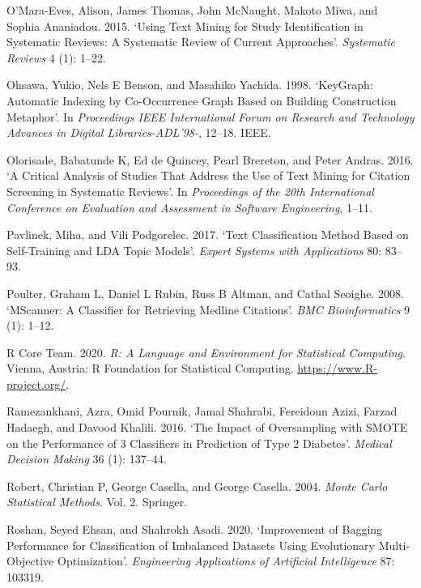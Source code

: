 \documentclass{article}
\newlength{\cslhangindent}
\newenvironment{CSLReferences}[2] %
 {%
  \setlength{\parindent}{0pt}
  \ifodd #1 \everypar{\setlength{\hangindent}{\cslhangindent}}\ignorespaces\fi
  \ifnum #2 > 0
  \setlength{\parskip}{#2\baselineskip}
  \fi
 }%
 {}
\begin{document}
\begin{CSLReferences}{1}{0}
\leavevmode{}%
O'Mara-Eves, Alison, James Thomas, John McNaught, Makoto Miwa, and
Sophia Ananiadou. 2015. {`Using Text Mining for Study Identification in
Systematic Reviews: A Systematic Review of Current Approaches'}.
\emph{Systematic Reviews} 4 (1): 1--22.

\leavevmode{}%
Ohsawa, Yukio, Nels E Benson, and Masahiko Yachida. 1998. {`KeyGraph:
Automatic Indexing by Co-Occurrence Graph Based on Building Construction
Metaphor'}. In \emph{Proceedings IEEE International Forum on Research
and Technology Advances in Digital Libraries-ADL'98-}, 12--18. IEEE.

\leavevmode{}%
Olorisade, Babatunde K, Ed de Quincey, Pearl Brereton, and Peter Andras.
2016. {`A Critical Analysis of Studies That Address the Use of Text
Mining for Citation Screening in Systematic Reviews'}. In
\emph{Proceedings of the 20th International Conference on Evaluation and
Assessment in Software Engineering}, 1--11.

\leavevmode{}%
Pavlinek, Miha, and Vili Podgorelec. 2017. {`Text Classification Method
Based on Self-Training and LDA Topic Models'}. \emph{Expert Systems with
Applications} 80: 83--93.

\leavevmode{}%
Poulter, Graham L, Daniel L Rubin, Russ B Altman, and Cathal Seoighe.
2008. {`MScanner: A Classifier for Retrieving Medline Citations'}.
\emph{BMC Bioinformatics} 9 (1): 1--12.

\leavevmode{}%
R Core Team. 2020. \emph{R: A Language and Environment for Statistical
Computing}. Vienna, Austria: R Foundation for Statistical Computing.
\url{https://www.R-project.org/}.

\leavevmode{}%
Ramezankhani, Azra, Omid Pournik, Jamal Shahrabi, Fereidoun Azizi,
Farzad Hadaegh, and Davood Khalili. 2016. {`The Impact of Oversampling
with SMOTE on the Performance of 3 Classifiers in Prediction of Type 2
Diabetes'}. \emph{Medical Decision Making} 36 (1): 137--44.

\leavevmode{}%
Robert, Christian P, George Casella, and George Casella. 2004.
\emph{Monte Carlo Statistical Methods}. Vol. 2. Springer.

\leavevmode{}%
Roshan, Seyed Ehsan, and Shahrokh Asadi. 2020. {`Improvement of Bagging
Performance for Classification of Imbalanced Datasets Using Evolutionary
Multi-Objective Optimization'}. \emph{Engineering Applications of
Artificial Intelligence} 87: 103319.


\end{CSLReferences}
\end{document}
